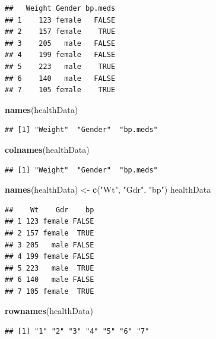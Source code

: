 \documentclass[]{article}
\newenvironment{Shaded}{\begin{snugshade}}{\end{snugshade}}
\newcommand{\KeywordTok}[1]{\textcolor[rgb]{0.13,0.29,0.53}{\textbf{#1}}}
\newcommand{\StringTok}[1]{\textcolor[rgb]{0.31,0.60,0.02}{#1}}
\newcommand{\NormalTok}[1]{#1}
\begin{document}
\begin{verbatim}
##   Weight Gender bp.meds
## 1    123 female   FALSE
## 2    157 female    TRUE
## 3    205   male   FALSE
## 4    199 female   FALSE
## 5    223   male    TRUE
## 6    140   male   FALSE
## 7    105 female    TRUE
\end{verbatim}

\begin{Shaded}
\begin{Highlighting}[]
\KeywordTok{names}\NormalTok{(healthData)}
\end{Highlighting}
\end{Shaded}

\begin{verbatim}
## [1] "Weight"  "Gender"  "bp.meds"
\end{verbatim}

\begin{Shaded}
\begin{Highlighting}[]
\KeywordTok{colnames}\NormalTok{(healthData)}
\end{Highlighting}
\end{Shaded}

\begin{verbatim}
## [1] "Weight"  "Gender"  "bp.meds"
\end{verbatim}

\begin{Shaded}
\begin{Highlighting}[]
\KeywordTok{names}\NormalTok{(healthData) <-}\StringTok{ }\KeywordTok{c}\NormalTok{(}\StringTok{"Wt"}\NormalTok{, }\StringTok{"Gdr"}\NormalTok{, }\StringTok{"bp"}\NormalTok{)}
\NormalTok{healthData}
\end{Highlighting}
\end{Shaded}

\begin{verbatim}
##    Wt    Gdr    bp
## 1 123 female FALSE
## 2 157 female  TRUE
## 3 205   male FALSE
## 4 199 female FALSE
## 5 223   male  TRUE
## 6 140   male FALSE
## 7 105 female  TRUE
\end{verbatim}

\begin{Shaded}
\begin{Highlighting}[]
\KeywordTok{rownames}\NormalTok{(healthData)}
\end{Highlighting}
\end{Shaded}

\begin{verbatim}
## [1] "1" "2" "3" "4" "5" "6" "7"
\end{verbatim}
\end{document}
